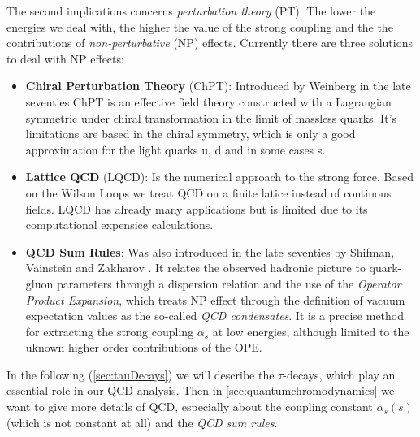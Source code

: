 \documentclass[../../index.tex]{subfiles}
\begin{document}
The second implications concerns \textit{perturbation theory} (PT). The lower
the energies we deal with, the higher the value of the strong coupling and the
the contributions of \textit{non-perturbative} (NP) effects. Currently there are
three solutions to deal with NP effects:
\begin{itemize}
  \item \textbf{Chiral Perturbation Theory} (ChPT): Introduced by Weinberg
    \cite{Weinberg1978} in the late seventies ChPT is an effective field theory
    constructed with a Lagrangian symmetric under chiral transformation in the
    limit of massless quarks. It's limitations are based in the chiral symmetry,
    which is only a good approximation for the light quarks u, d and in some
    cases s.
  \item \textbf{Lattice QCD} (LQCD): Is the numerical approach to the strong
    force. Based on the Wilson Loops \cite{Wilson1974} we treat QCD on a finite
    latice instead of continous fields. LQCD has already many applications but
    is limited due to its computational expensice calculations.
  \item \textbf{QCD Sum Rules}: Was also introduced in the late seventies by
    Shifman, Vainstein and Zakharov \cite{Shifman1978,Shifman1978a}. It relates
    the observed hadronic picture to quark-gluon parameters through a dispersion
    relation and the use of the \textit{Operator Product Expansion}, which
    treats NP effect through the definition of vacuum expectation values as the
    so-called \textit{QCD condensates}. It is a precise method for extracting
    the strong coupling $\alpha_s$ at low energies, although limited to
    the uknown higher order contributions of the OPE.
\end{itemize}


In the following (\cref{sec:tauDecays}) we will describe the $\tau$-decays, which
play an essential role in our QCD analysis. Then in \cref{sec:quantumchromodynamics} we want to give more
details of QCD, especially about the coupling constant $\alpha_s(s)$ (which is not
constant at all) and the \textit{QCD sum rules}.
\end{document}
